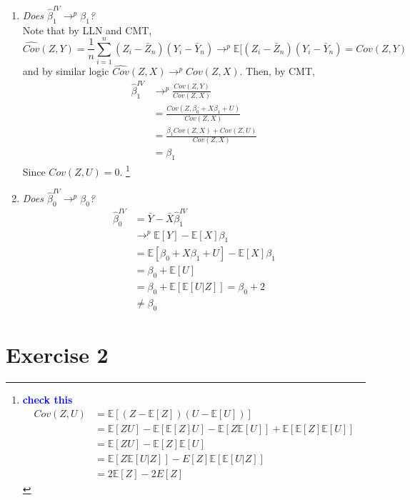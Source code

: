 \documentclass[12pt,oneside,reqno]{amsart}
\newcommand{\E}{\mathbb{E}}
\newcommand{\sumin}{\sum\limits_{i=1}^n} %
\newcommand{\fix} [1] {\textbf{\textcolor{blue}{#1}}} %
\begin{document}
\begin{enumerate}[label = (\roman*)]

\item \textit{Does $\hat{\beta}_1^{IV} \rightarrow^p \beta_1$?} \\
Note that by LLN and CMT, 
\[\widehat{Cov}(Z,Y) = \frac{1}{n} \sumin(Z_i-\bar{Z}_n)(Y_i-\bar{Y}_n) \rightarrow^p \E[(Z_i-\bar{Z}_n)(Y_i-\bar{Y}_n) = Cov(Z,Y)\]  
and by similar logic $\widehat{Cov}(Z,X) \rightarrow^p Cov(Z,X)$. Then, by CMT, 
\begin{align*}
\hat{\beta}^{IV}_1 & \rightarrow^p \frac{Cov(Z,Y)}{Cov(Z,X)} 
\\
& = \frac{Cov(Z, \beta_0 +X\beta_1 +U)}
    {Cov(Z,X)} 
    \\
& = \frac{\beta_1Cov(Z,X) +Cov(Z,U)}
    {Cov(Z,X)} 
    \\
& = \beta_1
\end{align*}
Since $Cov(Z,U) = 0$.
\footnote{ \fix{check this}
\begin{align*}
Cov(Z,U) & = \E[(Z-\E[Z])(U-\E[U])] 
\\
& = \E[ZU] -\E[\E[Z]U] -\E[Z\E[U]] +\E[\E[Z]\E[U]]
\\
& = \E[ZU] -\E[Z]\E[U] 
\\
& = \E[Z\E[U|Z]] - E[Z]\E[\E[U|Z]] \\
& = 2\E[Z] - 2E[Z]
\end{align*}
}
\\


\item \textit{Does $\hat{\beta}_0^{IV} \rightarrow^p \beta_0$?}
\begin{align*}
\hat{\beta}_0^{IV} 
& = \bar{Y}-\bar{X}\hat{\beta}_1^{IV} 
\\
& \rightarrow^p \E[Y]-\E[X]\beta_1 
\\
& = \E[\beta_0 +X\beta_1 +U]-\E[X]\beta_1 
\\
& = \beta_0 +\E[U] 
\\
& = \beta_0 +\E[\E[U|Z]] = \beta_0+2  \\
& \neq \beta_0
\end{align*}

\end{enumerate}



\section*{Exercise 2}
\end{document}
